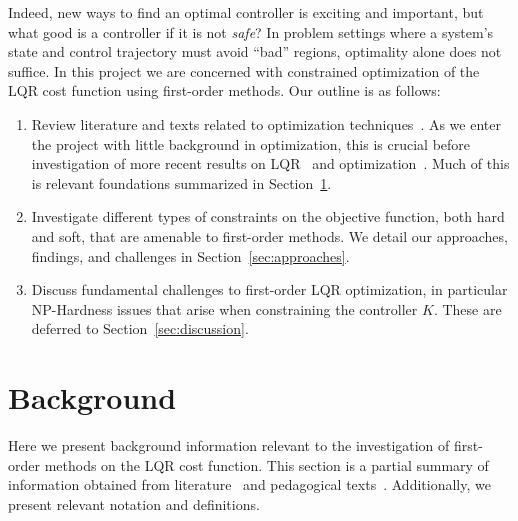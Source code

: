 \documentclass[11pt]{article}  %
\begin{document}
Indeed, new ways to find an optimal controller is exciting and important,
but what good is a controller if it is not \textit{safe}?
In problem settings where a system's state and control trajectory
must avoid ``bad'' regions, optimality alone does not suffice.
In this project we are concerned with constrained optimization of the LQR
cost function using first-order methods.
Our outline is as follows:
\begin{enumerate}
  \item[(1)]
    Review literature and texts related to
    optimization techniques~\cite{boyd2004convex, tibshirani2018convex}.
    As we enter the project with little background in optimization,
    this is crucial before investigation of
    more recent results on LQR~\cite{fazel2018global}
    and optimization~\cite{karimi2016linear}.
    Much of this is relevant foundations summarized in
    Section~\ref{sec:background}.


  \item[(2)]
    Investigate different types of constraints on the objective function,
    both hard and soft,
    that are amenable to first-order methods.
    We detail our approaches, findings, and challenges in
    Section~\ref{sec:approaches}.

  \item[(3)]
    Discuss fundamental challenges to first-order LQR optimization,
    in particular NP-Hardness issues that arise when
    constraining the controller \(K\).
    These are deferred to Section~\ref{sec:discussion}.

\end{enumerate}



\section{Background}
\label{sec:background}

Here we present background information relevant to the investigation of
first-order methods on the LQR cost function.
This section is a partial summary of information obtained from
literature~\cite{fazel2018global, karimi2016linear}
and pedagogical texts~\cite{boyd2004convex, tibshirani2018convex}.
Additionally, we present relevant notation and definitions.
\end{document}
